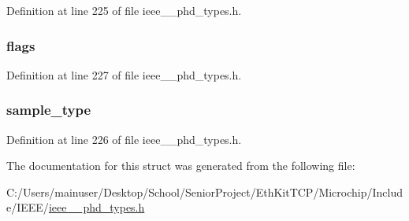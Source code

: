 Definition at line 225 of file ieee\+\_\+\_\+phd\+\_\+types.\+h.

\hypertarget{struct___sa_spec_a603eecbb0ea0f29c05aeaf15134236c5}{}
\subsubsection[{flags}]{ flags}\label{struct___sa_spec_a603eecbb0ea0f29c05aeaf15134236c5}


Definition at line 227 of file ieee\+\_\+\_\+phd\+\_\+types.\+h.

\hypertarget{struct___sa_spec_a936838cd492317d53a4598ecfbef9021}{}
\subsubsection[{sample\+\_\+type}]{ sample\+\_\+type}\label{struct___sa_spec_a936838cd492317d53a4598ecfbef9021}


Definition at line 226 of file ieee\+\_\+\_\+phd\+\_\+types.\+h.



The documentation for this struct was generated from the following file\+:\begin{DoxyCompactItemize}
\item 
C\+:/\+Users/mainuser/\+Desktop/\+School/\+Senior\+Project/\+Eth\+Kit\+T\+C\+P/\+Microchip/\+Include/\+I\+E\+E\+E/\hyperlink{ieee__11073__phd__types_8h}{ieee\+\_\+\_\+phd\+\_\+types.\+h}\end{DoxyCompactItemize}
